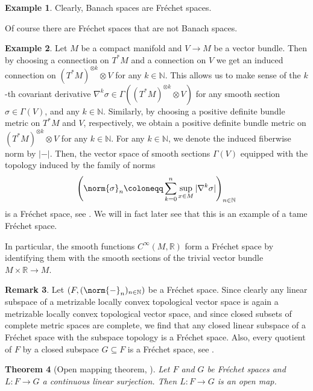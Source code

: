 \documentclass[12pt,a4paper]{article}
\theoremstyle{plain}
\newtheorem{theorem}{Theorem}[subsection]
\theoremstyle{definition}
\newtheorem{example}[theorem]{Example}
\newtheorem{remark}[theorem]{Remark}
\newcommand{\R}{\mathbb{R}}
\newcommand{\N}{\mathbb{N}}
\newcommand{\nnorm}[2]{\norm{#1}_{#2}}
\newcommand{\tens}{\otimes}
\begin{document}
\begin{example}
Clearly, Banach spaces are Fréchet spaces.
\end{example}

Of course there are Fréchet spaces that are not Banach spaces.
\begin{example}
\label{Ex:SmoothSectionsFrechetSpace}
Let $M$ be a compact manifold and $V\to M$ be a vector bundle. Then by choosing a connection on $T^*M$ and a connection on $V$ we get an induced connection on $(T^*M)^{\tens k}\tens V$ for any $k\in \N$. This allows us to make sense of the $k$-th covariant derivative $\nabla^k\sigma\in \Gamma((T^*M)^{\tens k}\tens V)$ for any smooth section $\sigma\in \Gamma(V)$, and any $k\in \N$. Similarly, by choosing a positive definite bundle metric on $T^*M$ and $V$, respectively, we obtain a positive definite bundle metric on $(T^*M)^{\tens k}\tens V$ for any $k\in \N$. For any $k\in \N$, we denote the induced fiberwise norm by $|-|$.
Then, the vector space of smooth sections $\Gamma(V)$ equipped with the topology induced by the family of norms
\begin{align*}
    \left( \nnorm{\sigma}{n}\coloneqq \sum_{k=0}^n \sup_{x\in M}|\nabla^k\sigma|\right)_{n\in \N}
\end{align*}
is a Fréchet space, see \cite[Part I, Example 1.1.5]{hamilton}. We will in fact later see that this is an example of a tame Fréchet space.

In particular, the smooth functions $C^\infty(M,\R)$ form a Fréchet space by identifying them with the smooth sections of the trivial vector bundle $M\times \R\to M$.
\end{example}



\begin{remark}
\label{Rem:ClosedSubspAndQuotientFrechet}
Let $(F,(\nnorm{-}{n})_{n\in \N})$ be a Fréchet space. Since clearly any linear subspace of a metrizable locally convex topological vector space is again a metrizable locally convex topological vector space, and since closed subsets of complete metric spaces are complete, we find that any closed linear subspace of a Fréchet space with the subspace topology is a Fréchet space. 
Also, every quotient of $F$ by a closed subspace $G\subseteq F$ is a Fréchet space, see \cite[Chapter I, 2.3 and Chapter II, §4, p.~49]{SchaeferTVS}.
\end{remark}

\begin{theorem}[Open mapping theorem, {\cite[Corollaries 2.12]{rudin1991functional}}]
\label{Thm:OpenMapping}
Let $F$ and $G$ be Fréchet spaces and $L:F\to G$ a continuous linear surjection. Then $L:F\to G$ is an open map.
\end{theorem}
\end{document}
